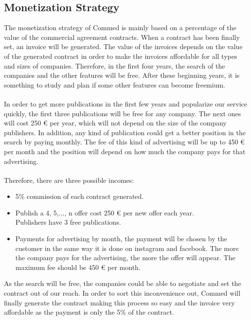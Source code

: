 \documentclass[./main.tex]{subfiles}
\begin{document}
\let\texteuro\euro
\subsection{Monetization Strategy}
The monetization strategy of Commed is mainly based on a percentage of the value of the commercial agreement contracts. When a contract has been finally set, an invoice will be generated. The value of the invoices depends on the value of the generated contract in order to make the invoices affordable for all types and sizes of companies. Therefore, in the first four years, the search of the companies and the other features will be free. After these beginning years, it is something to study and plan if some other features can become freemium.
\\
\\
In order to get more publications in the first few years and popularize our service quickly, the first three publications will be free for any company. The next ones will cost 250 € per year, which will not depend on the size of the company publishers.
In addition, any kind of publication could get a better position in the search by paying monthly. The fee of this kind of advertising will be up to 450 € per month and the position will depend on how much the company pays for that advertising.
\\
\\
Therefore, there are three possible incomes:
\begin{itemize}
	\item 5\% commission of each contract generated.
	\item Publish a 4, 5,..., n offer cost 250 € per new offer each year. \\Publishers have 3 free publications.
	\item Payments for advertising by month, the payment will be chosen by the customer in the same way it is done on instagram and facebook. The more the company pays for the advertising, the more the offer will appear. The maximum fee should be 450 € per month.
\end{itemize}
As the search will be free, the companies could be able to negotiate and set the contract out of our reach. In order to sort this inconvenience out, Commed will finally generate the contract making this process so easy and the invoice very affordable as the payment is only the 5\% of the contract.
\end{document}
